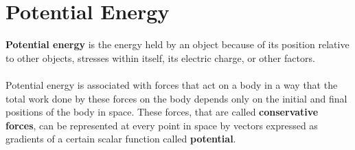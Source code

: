 \section{Potential Energy}
\textbf{Potential energy} is the energy held by an object because of its position relative to other objects, stresses within itself, its electric charge, or other factors.
\\\\
Potential energy is associated with forces that act on a body in a way that the total work done by these forces on the body depends only on the initial and final positions of the body in space. These forces, that are called \textbf{conservative forces}, can be represented at every point in space by vectors expressed as gradients of a certain scalar function called \textbf{potential}.

